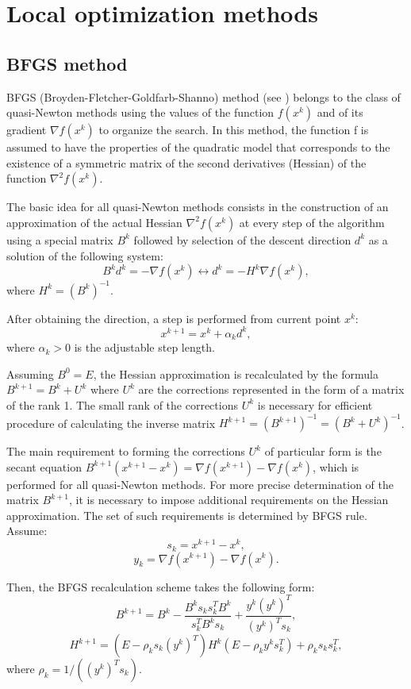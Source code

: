 \documentclass[runningheads]{llncs}
\begin{document}
\section{Local optimization methods}\label{sec:local}
\subsection{BFGS method}

BFGS (Broyden-Fletcher-Goldfarb-Shanno) method (see \cite{Nocedal}) belongs to the class of quasi-Newton methods using the values of the function $f(x^k)$ and of its gradient $\nabla f(x^k)$ to organize the search. In this method, the function f is assumed to have the properties of the quadratic model that corresponds to the existence of a symmetric matrix of the second derivatives (Hessian) of the function $\nabla^2 f(x^k)$.

The basic idea for all quasi-Newton methods consists in the construction of an approximation of the actual Hessian $\nabla^2 f(x^k)$ at every step of the algorithm using a special matrix $B^k$ followed by selection of the descent direction $d^k$ as a solution of the following system:
$$ B^k d^k = -\nabla f(x^k) \leftrightarrow d^k = -H^k \nabla f(x^k),$$
where $H^k={(B^k)}^{-1}$.

After obtaining the direction, a step is performed from current point $x^k$:
$$ x^{k+1}=x^k+ \alpha_k d^k,$$
where $\alpha_k>0$ is the adjustable step length.

Assuming $B^0=E$, the Hessian approximation is recalculated by the formula $B^{k+1}= B^k+ U^k$ where $U^k$ are the corrections represented in the form of a matrix of the rank 1. The small rank of the corrections $U^k$ is necessary for efficient procedure of calculating the inverse matrix $H^{k+1}=(B^{k+1})^{-1}=(B^k+ U^k)^{-1}$.

The main requirement to forming the corrections $U^k$ of particular form is the secant equation $B^{k+1} (x^{k+1} - x^k )= \nabla f(x^{k+1})- \nabla f(x^k)$, which is performed for all quasi-Newton methods. For more precise determination of the matrix $B^{k+1}$, it is necessary to impose additional requirements on the Hessian approximation. The set of such requirements is determined by BFGS rule. Assume:
$$ s_k = x^{k+1} - x^k,$$
$$ y_k = \nabla f(x^{k+1})- \nabla f(x^k).$$

Then, the BFGS recalculation scheme takes the following form:
$$ B^{k+1} = B^k - \frac{B^k s_k s_k^T B^k}{s_k^T B^k s_k} + \frac{y^k (y^k)^{T}}{(y^k)^{T} s_k},$$
$$ H^{k+1} = (E - \rho_k s_k (y^k)^{T}) H^k (E - \rho_k y^k s_k^T) + \rho_k s_k s_k^T,$$
where $\rho_k = 1/((y^k)^{T} s_k)$.
\end{document}
